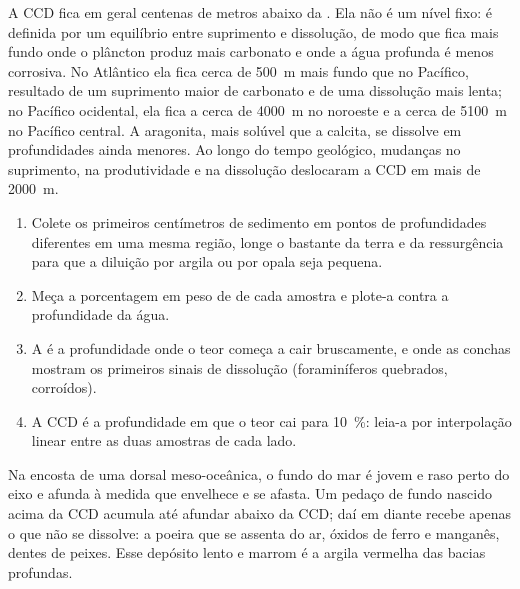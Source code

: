 A CCD fica em geral centenas de metros abaixo da . Ela não é um nível fixo: é
definida por um equilíbrio entre suprimento e dissolução, de modo que fica mais fundo onde
o plâncton produz mais carbonato e onde a água profunda é menos corrosiva. No Atlântico ela
fica cerca de \qty{500}{m} mais fundo que no Pacífico, resultado de um suprimento maior de
carbonato e de uma dissolução mais lenta; no Pacífico ocidental, ela fica a cerca de
\qty{4000}{m} no noroeste e a cerca de \qty{5100}{m} no Pacífico central. A aragonita, mais
solúvel que a calcita, se dissolve em profundidades ainda menores. Ao longo do tempo
geológico, mudanças no suprimento, na produtividade e na dissolução deslocaram a CCD em
mais de \qty{2000}{m}.

\begin{method}\label{met:b1:chemical-biogenic-sediments:ccd}
\begin{enumerate}
  \item Colete os primeiros centímetros de sedimento em pontos de profundidades diferentes
        em uma mesma região, longe o bastante da terra e da ressurgência para que a diluição
        por argila ou por opala seja pequena.
  \item Meça a porcentagem em peso de  de cada amostra e plote-a contra a
        profundidade da água.
  \item A  é a profundidade onde o teor começa a cair bruscamente, e onde as conchas
        mostram os primeiros sinais de dissolução (foraminíferos quebrados, corroídos).
  \item A CCD é a profundidade em que o teor cai para \qty{10}{\%}: leia-a por interpolação
        linear entre as duas amostras de cada lado.
\end{enumerate}
\end{method}

Na encosta de uma dorsal meso-oceânica, o fundo do mar é jovem e raso perto do eixo e afunda
à medida que envelhece e se afasta. Um pedaço de fundo nascido acima da CCD acumula  até afundar abaixo da CCD; daí em diante recebe apenas o que não se dissolve: a
poeira que se assenta do ar, óxidos de ferro e manganês, dentes de peixes. Esse depósito
lento e marrom é a argila vermelha das bacias profundas.

